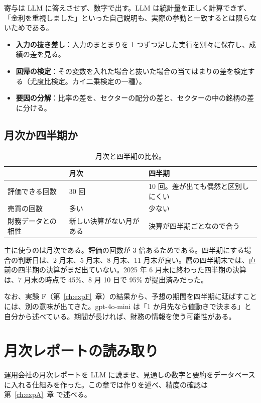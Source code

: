 \documentclass[xelatex,ja=standard,jafont=hiragino-pron,a4paper,10pt]{bxjsreport}
\newcommand{\chapref}[1]{第~\ref{#1}~章}
\begin{document}
寄与は LLM に答えさせず、数字で出す。LLM は統計量を正しく計算できず、「金利を重視しました」といった自己説明も、実際の挙動と一致するとは限らないためである。

\begin{itemize}
\item \textbf{入力の抜き差し}：入力のまとまりを 1 つずつ足した実行を別々に保存し、成績の差を見る。
\item \textbf{回帰の検定}：その変数を入れた場合と抜いた場合の当てはまりの差を検定する（尤度比検定。カイ二乗検定の一種）。
\item \textbf{要因の分解}：比率の差を、セクターの配分の差と、セクターの中の銘柄の差に分ける。
\end{itemize}

\section{月次か四半期か}

\begin{table}[htbp]
\centering
\caption{月次と四半期の比較。}
\small
\begin{tabular}{p{3.60cm}p{4.60cm}p{4.80cm}}
\toprule
 & 月次 & 四半期 \\
\midrule
評価できる回数 & 30 回 & 10 回。差が出ても偶然と区別しにくい \\
売買の回数 & 多い & 少ない \\
財務データとの相性 & 新しい決算がない月がある & 決算が四半期ごとなので合う \\
\bottomrule
\end{tabular}
\end{table}

主に使うのは月次である。評価の回数が 3 倍あるためである。四半期にする場合の判断日は、2 月末、5 月末、8 月末、11 月末が良い。暦の四半期末では、直前の四半期の決算がまだ出ていない。2025 年 6 月末に終わった四半期の決算は、7 月末の時点で 45\%、8 月 10 日で 95\% が提出済みだった。

なお、実験 F（\chapref{ch:expF}）の結果から、予想の期間を四半期に延ばすことには、別の意味が出てきた。gpt-4o-mini は「1 か月先なら値動きで決まる」と自分から述べている。期間が長ければ、財務の情報を使う可能性がある。

\chapter{月次レポートの読み取り}\label{ch:reports}

運用会社の月次レポートを LLM に読ませ、見通しの数字と要約をデータベースに入れる仕組みを作った。この章では作りを述べ、精度の確認は \chapref{ch:expA} で述べる。
\end{document}
